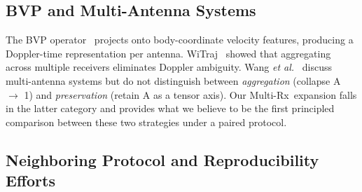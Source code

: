 \documentclass[journal,11pt]{IEEEtran}
\newcommand{\CSI}{\text{CSI}}
\newcommand{\MultiRx}{Multi-Rx}
\newcommand{\etal}{\textit{et al.}}
\begin{document}
\subsection{BVP and Multi-Antenna Systems}
The BVP operator~\cite{zheng2019widar} projects \CSI{} onto body-coordinate velocity features, producing a Doppler-time representation per antenna. WiTraj~\cite{wu2021} showed that aggregating across multiple receivers eliminates Doppler ambiguity. Wang \etal~\cite{wang2026survey} discuss multi-antenna systems but do not distinguish between \emph{aggregation} (collapse A $\to$ 1) and \emph{preservation} (retain A as a tensor axis). Our \MultiRx\ expansion falls in the latter category and provides what we believe to be the first principled comparison between these two strategies under a paired protocol.

\subsection{Neighboring Protocol and Reproducibility Efforts}
\label{sec:related-neighbors}
\end{document}
